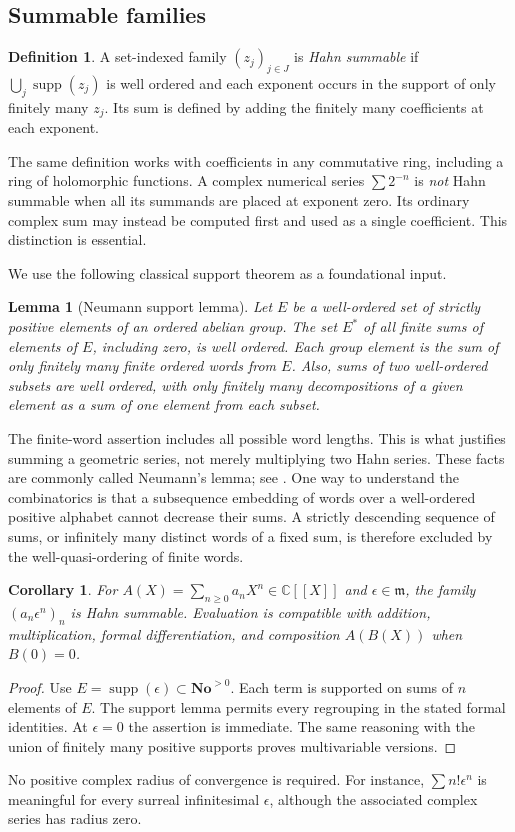 \documentclass[11pt,oneside]{article}
\numberwithin{equation}{section}
\newtheorem{lemma}[theorem]{Lemma}
\newtheorem{corollary}[theorem]{Corollary}
\theoremstyle{definition}
\newtheorem{definition}[theorem]{Definition}
\theoremstyle{remark}\newtheorem{remark}[theorem]{Remark}
\newcommand{\No}{\mathbf{No}}
\newcommand{\C}{\mathbb C}
\newcommand{\m}{\mathfrak m}
\newcommand{\supp}{\operatorname{supp}}
\begin{document}
\subsection{Summable families}
\begin{definition}
A set-indexed family $(z_j)_{j\in J}$ is \emph{Hahn summable} if
$\bigcup_j\supp(z_j)$ is well ordered and each exponent occurs in the
support of only finitely many $z_j$. Its sum is defined by adding the
finitely many coefficients at each exponent.
\end{definition}
The same definition works with coefficients in any commutative ring,
including a ring of holomorphic functions. A complex numerical series
$\sum 2^{-n}$ is \emph{not} Hahn summable when all its summands are placed
at exponent zero. Its ordinary complex sum may instead be computed first
and used as a single coefficient. This distinction is essential.

We use the following classical support theorem as a foundational input.
\begin{lemma}[Neumann support lemma]\label{lem:neumann}
Let $E$ be a well-ordered set of strictly positive elements of an ordered
abelian group. The set $E^*$ of all finite sums of elements of $E$, including
zero, is well ordered. Each group element is the sum of only finitely many
finite ordered words from $E$. Also, sums of two well-ordered subsets are
well ordered, with only finitely many decompositions of a given element
as a sum of one element from each subset.
\end{lemma}
The finite-word assertion includes all possible word lengths. This is what
justifies summing a geometric series, not merely multiplying two Hahn
series. These facts are commonly called Neumann's lemma; see
\cite{Neumann}. One way to understand the combinatorics is that a
subsequence embedding of words over a well-ordered positive alphabet
cannot decrease their sums. A strictly descending sequence of sums, or
infinitely many distinct words of a fixed sum, is therefore excluded by
the well-quasi-ordering of finite words.

\begin{corollary}\label{cor:formal-evaluation}
For $A(X)=\sum_{n\geq0}a_nX^n\in\C[[X]]$ and $\epsilon\in\m$, the
family $(a_n\epsilon^n)_n$ is Hahn summable. Evaluation is compatible with
addition, multiplication, formal differentiation, and composition
$A(B(X))$ when $B(0)=0$.
\end{corollary}
\begin{proof}
Use $E=\supp(\epsilon)\subset\No^{>0}$. Each term is supported on
sums of $n$ elements of $E$. The support lemma permits every regrouping
in the stated formal identities. At $\epsilon=0$ the assertion is
immediate. The same reasoning with the union of finitely many positive
supports proves multivariable versions.
\end{proof}
No positive complex radius of convergence is required. For instance,
$\sum n!\epsilon^n$ is meaningful for every surreal infinitesimal
$\epsilon$, although the associated complex series has radius zero.
\end{document}
